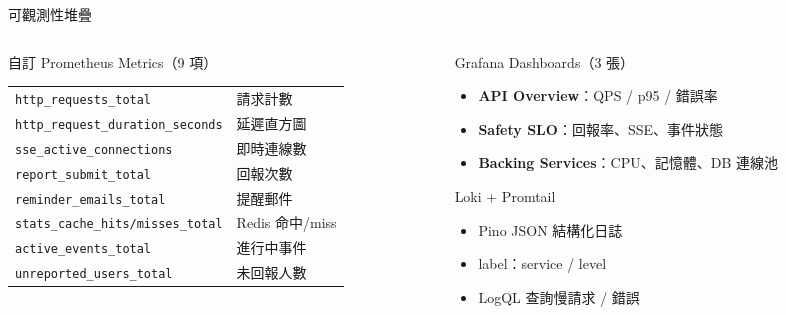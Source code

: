 \documentclass[aspectratio=169,12pt]{beamer}
\begin{document}
\begin{frame}[shrink=12]{可觀測性堆疊}
\begin{columns}[T,onlytextwidth]
\begin{column}{0.55\textwidth}
  \begin{block}{自訂 Prometheus Metrics（9 項）}
    \renewcommand{\arraystretch}{1.0}
    \begin{tabular}{ll}
    \scriptsize\texttt{http\_requests\_total}          & \scriptsize 請求計數 \\
    \scriptsize\texttt{http\_request\_duration\_seconds}& \scriptsize 延遲直方圖 \\
    \scriptsize\texttt{sse\_active\_connections}       & \scriptsize 即時連線數 \\
    \scriptsize\texttt{report\_submit\_total}           & \scriptsize 回報次數 \\
    \scriptsize\texttt{reminder\_emails\_total}         & \scriptsize 提醒郵件 \\
    \scriptsize\texttt{stats\_cache\_hits/misses\_total}& \scriptsize Redis 命中/miss \\
    \scriptsize\texttt{active\_events\_total}           & \scriptsize 進行中事件 \\
    \scriptsize\texttt{unreported\_users\_total}        & \scriptsize 未回報人數 \\
    \end{tabular}
  \end{block}
\end{column}
\begin{column}{0.41\textwidth}
  \begin{block}{Grafana Dashboards（3 張）}
    \begin{itemize}\small
      \item \textbf{API Overview}：QPS / p95 / 錯誤率
      \item \textbf{Safety SLO}：回報率、SSE、事件狀態
      \item \textbf{Backing Services}：CPU、記憶體、DB 連線池
    \end{itemize}
  \end{block}
  \begin{block}{Loki + Promtail}
    \begin{itemize}\small
      \item Pino JSON 結構化日誌
      \item label：service / level
      \item LogQL 查詢慢請求 / 錯誤
    \end{itemize}
  \end{block}
\end{column}
\end{columns}
\end{frame}
\end{document}
